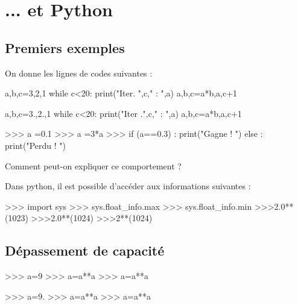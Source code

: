 \documentclass[10pt,fleqn]{article} %
\begin{document}
\section{... et Python}
\subsection{Premiers exemples}
On donne les lignes de codes suivantes :

\begin{minipage}[c]{.3\linewidth}
\begin{py}
\begin{python}
a,b,c=3,2,1
while c<20:
    print("Iter. ",c," : ",a)
    a,b,c=a*b,a,c+1
\end{python}
\end{py}
\end{minipage}\hfill
\begin{minipage}[c]{.3\linewidth}
\begin{py}
\begin{python}
a,b,c=3.,2.,1
while c<20:
    print("Iter .",c," : ",a)
    a,b,c=a*b,a,c+1
\end{python}
\end{py}
\end{minipage}\hfill
\begin{minipage}[c]{.3\linewidth}
\begin{py}
\begin{python}
>>> a =0.1
>>> a =3*a
>>> if (a==0.3) :
    print("Gagne ! ")
else :
    print("Perdu ! ")
\end{python}
\end{py}
\end{minipage}

Comment peut-on expliquer ce comportement ?

Dans python, il est possible d'accéder aux informations suivantes : 
\begin{py}
\begin{python}
>>> import sys
>>> sys.float_info.max
>>> sys.float_info.min
>>>2.0**(1023)
>>>2.0**(1024)
>>>2**(1024)
\end{python}
\end{py}


\subsection{Dépassement de capacité}

\begin{minipage}[c]{.45\linewidth}
\begin{py}
\begin{python}
>>> a=9
>>> a=a**a
>>> a=a**a
\end{python}
\end{py}
\end{minipage}\hfill
\begin{minipage}[c]{.45\linewidth}
\begin{py}
\begin{python}
>>> a=9.
>>> a=a**a
>>> a=a**a
\end{python}
\end{py}
\end{minipage}
\end{document}
